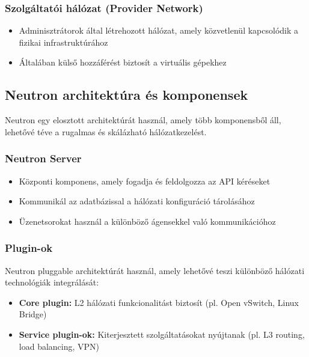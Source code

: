 \documentclass[a4paper,12pt]{article}
\begin{document}
    \subsubsection{Szolgáltatói hálózat (Provider Network)}

    \begin{itemize}
        \item Adminisztrátorok által létrehozott hálózat, amely közvetlenül kapcsolódik a fizikai infrastruktúrához
        \item Általában külső hozzáférést biztosít a virtuális gépekhez
    \end{itemize}

    \subsection{Neutron architektúra és komponensek}

    Neutron egy elosztott architektúrát használ, amely több komponensből áll, lehetővé téve a rugalmas és skálázható hálózatkezelést.

    \subsubsection{Neutron Server}

    \begin{itemize}
        \item Központi komponens, amely fogadja és feldolgozza az API kéréseket
        \item Kommunikál az adatbázissal a hálózati konfiguráció tárolásához
        \item Üzenetsorokat használ a különböző ágensekkel való kommunikációhoz
    \end{itemize}

    \subsubsection{Plugin-ok}

    Neutron pluggable architektúrát használ, amely lehetővé teszi különböző hálózati technológiák integrálását:

    \begin{itemize}
        \item \textbf{Core plugin:} L2 hálózati funkcionalitást biztosít (pl. Open vSwitch, Linux Bridge)
        \item \textbf{Service plugin-ok:} Kiterjesztett szolgáltatásokat nyújtanak (pl. L3 routing, load balancing, VPN)
    \end{itemize}
\end{document}
